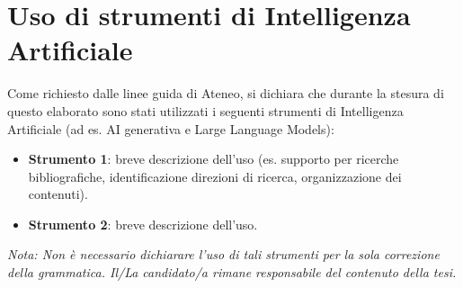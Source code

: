\chapter*{Uso di strumenti di Intelligenza Artificiale}

Come richiesto dalle linee guida di Ateneo, si dichiara che durante la stesura di questo elaborato sono stati utilizzati i seguenti strumenti di Intelligenza Artificiale (ad es. AI generativa e Large Language Models):
\begin{itemize}
    \item \textbf{Strumento 1}: breve descrizione dell'uso (es. supporto per ricerche bibliografiche, identificazione direzioni di ricerca, organizzazione dei contenuti).
    \item \textbf{Strumento 2}: breve descrizione dell'uso.
\end{itemize}

\textit{Nota: Non è necessario dichiarare l'uso di tali strumenti per la sola correzione della grammatica. Il/La candidato/a rimane responsabile del contenuto della tesi.}
